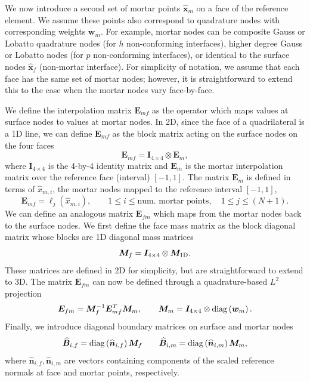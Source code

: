 \documentclass{svjour3}                     %
\renewcommand{\hat}{\widehat}
\newcommand{\diag}[1]{{\rm diag}\LRp{#1}}
\newcommand{\LRp}[1]{\left( #1 \right)}
\begin{document}
We now introduce a second set of mortar points $\hat{\bm{x}}_m$ on a face of the reference element.  We assume these points also correspond to quadrature nodes with corresponding weights $\bm{w}_m$.  For example, mortar nodes can be composite Gauss or Lobatto quadrature nodes (for $h$ non-conforming interfaces), higher degree Gauss or Lobatto nodes (for $p$ non-conforming interfaces), or identical to the surface nodes $\hat{\bm{x}}_f$ (non-mortar interface).   For simplicity of notation, we assume that each face has the same set of mortar nodes; however, it is straightforward to extend this to the case when the mortar nodes vary face-by-face.  

We define the interpolation matrix $\bm{E}_{mf}$ as the operator which maps values at surface nodes to values at mortar nodes.  In 2D, since the face of a quadrilateral is a 1D line, we can define $\bm{E}_{mf}$ as the block matrix acting on the surface nodes on the four faces 
\[
\bm{E}_{mf} = \bm{I}_{4\times 4}\otimes \bm{E}_m,
\]
where $\bm{I}_{4\times 4}$ is the 4-by-4 identity matrix and $\bm{E}_m$ is the mortar interpolation matrix over the reference face (interval) $[-1,1]$.  The matrix $\bm{E}_m$ is defined in terms of $\hat{x}_{m,i}$, the mortar nodes mapped to the reference interval $[-1,1]$,   
\[
\bm{E}_{mf} = \ell_j(\hat{x}_{m,i}), \qquad 1\leq i \leq \text{num.\ mortar points}, \quad 1\leq j \leq (N+1).
\]
We can define an analogous matrix $\bm{E}_{fm}$ which maps from the mortar nodes back to the surface nodes.  We first define the face mass matrix as the block diagonal matrix whose blocks are 1D diagonal mass matrices
\[
\bm{M}_f = \bm{I}_{4\times 4} \otimes \bm{M}_{\rm 1D}.
\]
These matrices are defined in 2D for simplicity, but are straightforward to extend to 3D.  
The matrix $\bm{E}_{fm}$ can now be defined through a quadrature-based $L^2$ projection 
\begin{equation}
\bm{E}_{fm} = \bm{M}_f^{-1}\bm{E}_{mf}^T\bm{M}_m, \qquad \bm{M}_m = \bm{I}_{4\times 4}\otimes \diag{\bm{w}_m}.
\label{eq:Efm}
\end{equation}
Finally, we introduce diagonal boundary matrices on surface and mortar nodes 
\begin{equation}
\hat{\bm{B}}_{i,f} = \diag{\hat{\bm{n}}_{i,f}}\bm{M}_f %
\qquad \hat{\bm{B}}_{i,m} = \diag{\hat{\bm{n}}_{i,m}}\bm{M}_m,%
\label{eq:Bi}
\end{equation}
where $\hat{\bm{n}}_{i,f}, \hat{\bm{n}}_{i,m}$ are vectors containing components of the scaled reference normals at face and mortar points, respectively.  
\end{document}

